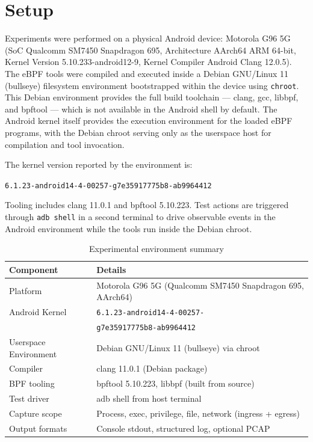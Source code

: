 \documentclass{mnitjaipur}
\begin{document}
\section{Setup}
Experiments were performed on a physical Android device: Motorola G96 5G (SoC Qualcomm SM7450 Snapdragon 695, Architecture AArch64 ARM 64-bit, Kernel Version 5.10.233-android12-9, Kernel Compiler Android Clang 12.0.5). The eBPF tools were compiled and executed inside a Debian GNU/Linux 11 (bullseye) filesystem environment bootstrapped within the device using \texttt{chroot}. This Debian environment provides the full build toolchain — clang, gcc, libbpf, and bpftool — which is not available in the Android shell by default. The Android kernel itself provides the execution environment for the loaded eBPF programs, with the Debian chroot serving only as the userspace host for compilation and tool invocation.

The kernel version reported by the environment is:
\begin{center}
\small\texttt{6.1.23-android14-4-00257-g7e35917775b8-ab9964412}
\end{center}
Tooling includes clang 11.0.1 and bpftool 5.10.223. Test actions are triggered through \texttt{adb shell} in a second terminal to drive observable events in the Android environment while the tools run inside the Debian chroot.

\begin{table}[H]
  \centering
  \caption{Experimental environment summary}
  \begin{tabular}{|p{}|p{}|}
    \hline
    \textbf{Component} & \textbf{Details} \\ \hline
    Platform & Motorola G96 5G (Qualcomm SM7450 Snapdragon 695, AArch64) \\ \hline
    Android Kernel & \small\texttt{6.1.23-android14-4-00257-}\\
    & \small\texttt{g7e35917775b8-ab9964412} \\ \hline
    Userspace Environment & Debian GNU/Linux 11 (bullseye) via chroot \\ \hline
    Compiler & clang 11.0.1 (Debian package) \\ \hline
    BPF tooling & bpftool 5.10.223, libbpf (built from source) \\ \hline
    Test driver & adb shell from host terminal \\ \hline
    Capture scope & Process, exec, privilege, file, network (ingress + egress) \\ \hline
    Output formats & Console stdout, structured log, optional PCAP \\ \hline
  \end{tabular}
\end{table}
\end{document}
